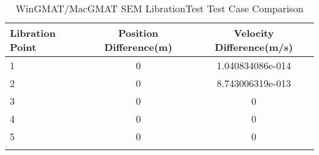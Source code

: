 \begin{table}[htbp!]
\centering
\caption{ WinGMAT/MacGMAT SEM LibrationTest Test Case Comparison}
      \begin{tabular}{lcc}
      \hline\hline
          Libration Point & Position Difference(m) & Velocity Difference(m/s) \\
         \hline
         1 & 0 & 1.040834086e-014 \\
         2 & 0 & 8.743006319e-013 \\
         3 & 0 & 0 \\
         4 & 0 & 0 \\
         5 & 0 & 0 \\
      \hline\hline
      \label{Table: WinGMAT-MacGMAT SEM LibrationTest Table} 
\end{tabular}
\end{table}
